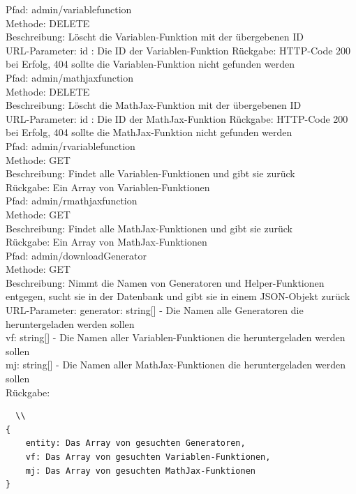\noindent Pfad: admin/variablefunction \\
Methode: DELETE \\
Beschreibung: Löscht die Variablen-Funktion mit der übergebenen ID \\
URL-Parameter: id : Die ID der Variablen-Funktion
Rückgabe: HTTP-Code 200 bei Erfolg, 404 sollte die Variablen-Funktion nicht gefunden werden \\

\noindent Pfad: admin/mathjaxfunction \\
Methode: DELETE \\
Beschreibung: Löscht die MathJax-Funktion mit der übergebenen ID \\
URL-Parameter: id : Die ID der MathJax-Funktion
Rückgabe: HTTP-Code 200 bei Erfolg, 404 sollte die MathJax-Funktion nicht gefunden werden \\

\noindent Pfad: admin/rvariablefunction \\
Methode: GET \\
Beschreibung: Findet alle Variablen-Funktionen und gibt sie zurück \\
Rückgabe: Ein Array von Variablen-Funktionen \\

\noindent Pfad: admin/rmathjaxfunction \\
Methode: GET \\
Beschreibung: Findet alle MathJax-Funktionen und gibt sie zurück \\
Rückgabe: Ein Array von MathJax-Funktionen \\

\noindent Pfad: admin/downloadGenerator \\
Methode: GET \\
Beschreibung: Nimmt die Namen von Generatoren und Helper-Funktionen entgegen, sucht sie in der Datenbank und gibt sie in einem JSON-Objekt zurück \\
URL-Parameter: generator: string[] - Die Namen alle Generatoren die heruntergeladen werden sollen \\
vf: string[] - Die Namen aller Variablen-Funktionen die heruntergeladen werden sollen \\
mj: string[] - Die Namen aller MathJax-Funktionen die heruntergeladen werden sollen \\
Rückgabe: \begin{lstlisting}  \\
{
	entity: Das Array von gesuchten Generatoren,
	vf: Das Array von gesuchten Variablen-Funktionen,
	mj: Das Array von gesuchten MathJax-Funktionen
}
\end{lstlisting}

